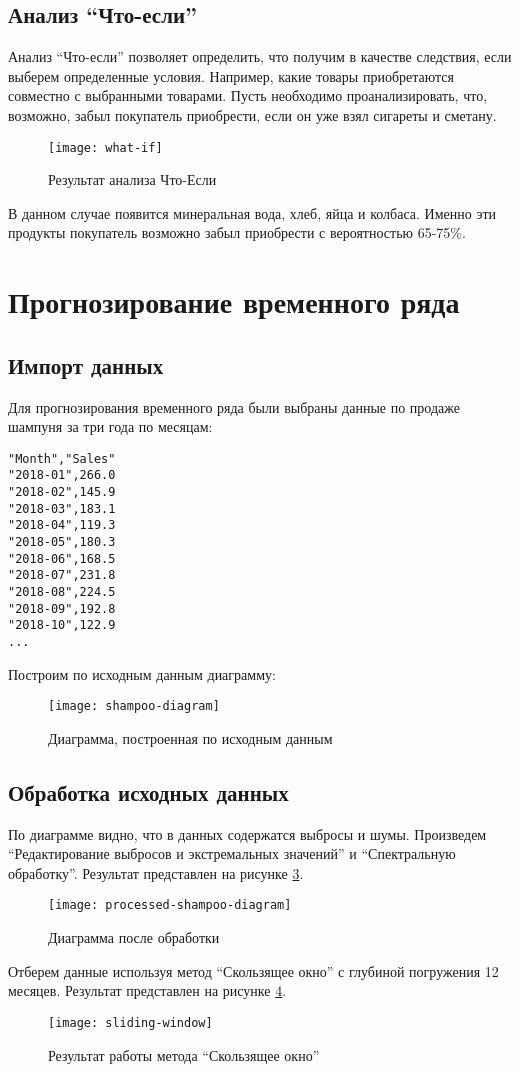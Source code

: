 \documentclass[a4paper,14pt]{extarticle}
\begin{document}
\subsection{Анализ \enquote{Что-если}} Анализ “Что-если” позволяет определить,
что получим в качестве следствия, если выберем определенные условия. Например,
какие товары приобретаются совместно с выбранными товарами. Пусть необходимо
проанализировать, что, возможно, забыл покупатель приобрести, если он уже взял
сигареты и сметану.
\begin{figure}[H]
    \centering
    \texttt{[image: what-if]}
    \caption{Результат анализа Что-Если}
    \label{fig:what-if}
\end{figure}
В данном случае появится минеральная вода, хлеб, яйца и колбаса. Именно эти
продукты покупатель возможно забыл приобрести с вероятностью 65-75\%.

\pagebreak
\section{Прогнозирование временного ряда}
\subsection{Импорт данных}
Для прогнозирования временного ряда были выбраны данные по продаже шампуня за
три года по месяцам:
\begin{lstlisting}
"Month","Sales"
"2018-01",266.0
"2018-02",145.9
"2018-03",183.1
"2018-04",119.3
"2018-05",180.3
"2018-06",168.5
"2018-07",231.8
"2018-08",224.5
"2018-09",192.8
"2018-10",122.9
...
\end{lstlisting}

Построим по исходным данным диаграмму:
\begin{figure}[H]
    \centering
    \texttt{[image: shampoo-diagram]}
    \caption{Диаграмма, построенная по исходным данным}
    \label{fig:shampoo-diagram}
\end{figure}

\subsection{Обработка исходных данных}
По диаграмме видно, что в данных содержатся выбросы и шумы. Произведем
\enquote{Редактирование выбросов и экстремальных значений} и \enquote{Спектральную
обработку}. Результат представлен на рисунке \ref{fig:processed-shampoo-diagram}.
\begin{figure}[H]
    \centering
    \texttt{[image: processed-shampoo-diagram]}
    \caption{Диаграмма после обработки}
    \label{fig:processed-shampoo-diagram}
\end{figure}
Отберем данные используя метод \enquote{Скользящее окно} с глубиной погружения
12 месяцев. Результат представлен на рисунке \ref{fig:sliding-window}.
\begin{figure}[H]
    \centering
    \texttt{[image: sliding-window]}
    \caption{Результат работы метода \enquote{Скользящее окно}}
    \label{fig:sliding-window}
\end{figure}
\end{document}

